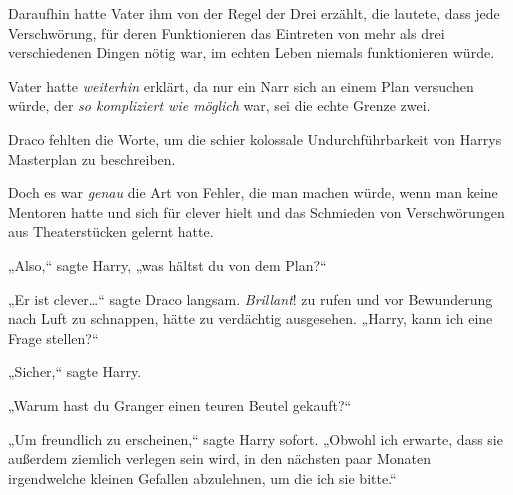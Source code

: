 Daraufhin hatte Vater ihm von der Regel der Drei erzählt, die lautete, dass jede Verschwörung, für deren Funktionieren das Eintreten von mehr als drei verschiedenen Dingen nötig war, im echten Leben niemals funktionieren würde.

Vater hatte \emph{weiterhin} erklärt, da nur ein Narr sich an einem Plan versuchen würde, der \emph{so kompliziert wie möglich} war, sei die echte Grenze zwei.

Draco fehlten die Worte, um die schier kolossale Undurchführbarkeit von Harrys Masterplan zu beschreiben.

Doch es war \emph{genau} die Art von Fehler, die man machen würde, wenn man keine Mentoren hatte und sich für clever hielt und das Schmieden von Verschwörungen aus Theaterstücken gelernt hatte.

„Also,“ sagte Harry, „was hältst du von dem Plan?“

„Er ist clever…“ sagte Draco langsam. \emph{Brillant}! zu rufen und vor Bewunderung nach Luft zu schnappen, hätte zu verdächtig ausgesehen. „Harry, kann ich eine Frage stellen?“

„Sicher,“ sagte Harry.

„Warum hast du Granger einen teuren Beutel gekauft?“

„Um freundlich zu erscheinen,“ sagte Harry sofort. „Obwohl ich erwarte, dass sie außerdem ziemlich verlegen sein wird, in den nächsten paar Monaten irgendwelche kleinen Gefallen abzulehnen, um die ich sie bitte.“

